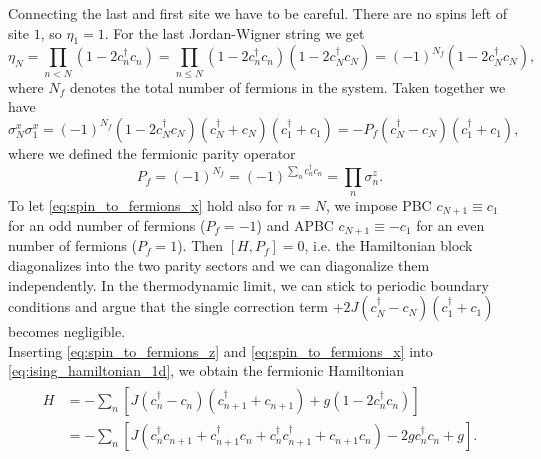 \noindent Connecting the last and first site we have to be careful. There are no spins left of site $1$, so $\eta_1 = 1$. For the last Jordan-Wigner string we get
\begin{equation}
	\eta_N = \prod_{n<N}(1-2c_n^{\dagger}c_n) = \prod_{n \leq N}(1-2c_n^{\dagger}c_n)(1-2c_N^{\dagger}c_N) = (-1)^{N_f}(1-2c_N^{\dagger}c_N),
\end{equation}
where $N_f$ denotes the total number of fermions in the system. Taken together we have
\begin{equation}
	\sigma^x_N \sigma^x_{1} = (-1)^{N_f}(1-2c_N^{\dagger}c_N)(c_N^{\dagger} + c_N)(c_{1}^{\dagger} + c_{1}) = - P_f (c_N^{\dagger} - c_N)(c_{1}^{\dagger} + c_{1}),
\end{equation}
where we defined the fermionic parity operator 
\begin{equation}
	P_f = (-1)^{N_f} = (-1)^{\sum_n c_n^{\dagger} c_n} = \prod_n \sigma^z_n.
\end{equation}
To let \eqref{eq:spin_to_fermions_x} hold also for $n = N$, we impose PBC $c_{N+1} \equiv c_1$ for an odd number of fermions ($P_f = -1$) and APBC $c_{N+1} \equiv -c_1$ for an even number of fermions ($P_f = 1$). Then $[H, P_f] = 0$, i.e. the Hamiltonian block diagonalizes into the two parity sectors and we can diagonalize them independently. In the thermodynamic limit, we can stick to periodic boundary conditions and argue that the single correction term $+2J (c_N^{\dagger} - c_N)(c_{1}^{\dagger} + c_{1})$ becomes negligible. \\

\noindent Inserting \eqref{eq:spin_to_fermions_z} and \eqref{eq:spin_to_fermions_x} into \eqref{eq:ising_hamiltonian_1d}, we obtain the fermionic Hamiltonian
\begin{align}
\begin{split}
	H &= - \sum_n \left[J(c_n^{\dagger} - c_n)(c_{n+1}^{\dagger} + c_{n+1}) + g(1 - 2c_n^{\dagger}c_n)  \right] \\
	&= - \sum_n \left[J(c_n^{\dagger}c_{n+1} + c_{n+1}^{\dagger}c_n + c_n^{\dagger}c_{n+1}^{\dagger} + c_{n+1}c_n) - 2gc_n^{\dagger}c_n + g  \right].
\end{split}
\end{align}

